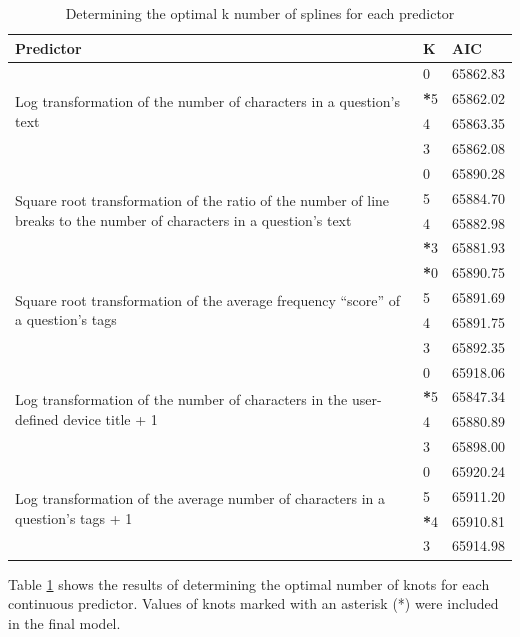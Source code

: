 \documentclass{article}
\begin{document}
\begin{table}[!htbp]
\centering
\begin{tabular}{| p{5cm} | l | l |}
  \hline
  \textbf{Predictor} & \textbf{K} & \textbf{AIC} \\ 
  \hline
  \multirow{ 4 }{ 5cm }{ Log transformation of the number of characters in a question's text } 
  & 0 & 65862.83 \\ 
  & \textbf{*}5 & 65862.02 \\ 
  & 4 & 65863.35 \\ 
  & 3 & 65862.08 \\ 
  \hline
  \multirow{ 4 }{ 5 cm }{ Square root transformation of the ratio of the number of line breaks to the number of characters in a question's text }
  & 0 & 65890.28 \\ 
  & 5 & 65884.70 \\ 
  & 4 & 65882.98 \\ 
  & \textbf{*}3 & 65881.93 \\ 
  \hline
  \multirow{ 4 }{ 5 cm }{ Square root transformation of the average frequency ``score'' of a question's tags }
  & \textbf{*}0 & 65890.75 \\ 
  & 5 & 65891.69 \\ 
  & 4 & 65891.75 \\ 
  & 3 & 65892.35 \\ 
  \hline
  \multirow{ 4 }{ 5 cm }{ Log transformation of the number of characters in the user-defined device title + 1 }
  & 0 & 65918.06 \\ 
  & \textbf{*}5 & 65847.34 \\ 
  & 4 & 65880.89 \\ 
  & 3 & 65898.00 \\ 
  \hline
  \multirow{ 4 }{ 5 cm }{ Log transformation of the average number of characters in a question's tags + 1 }
  & 0 & 65920.24 \\ 
  & 5 & 65911.20 \\ 
  & \textbf{*}4 & 65910.81 \\ 
  & 3 & 65914.98 \\ 
   \hline
\end{tabular}
\caption{Determining the optimal k number of splines for each predictor} 
\label{table:splines}
\end{table}

Table \ref{table:splines} shows the results of determining the optimal number of knots for each continuous predictor. Values of knots marked with an asterisk (*) were included in the final model. 
\end{document}
